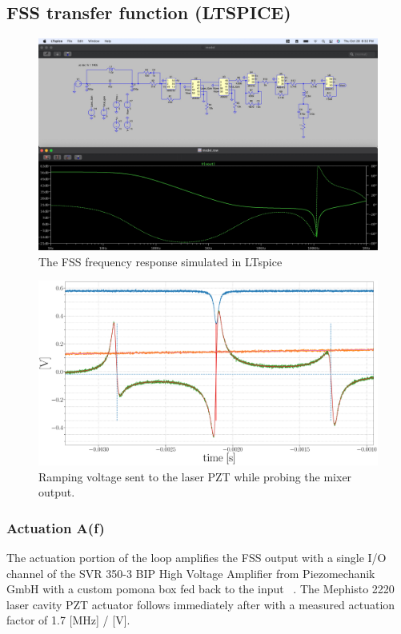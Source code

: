 \begin{landscape}
    \section{FSS transfer function (LTSPICE)}\label{fig:fss_tf}
\begin{figure}[H]
  \begin{center}
    \includegraphics[width=1.33\textwidth]{figs/ALGAAS/tfs/spice_FSS_tf.pdf}
    \caption{The FSS frequency response simulated in LTspice}
  \end{center}
  \label{fig:spiceFSS}
\end{figure}
\end{landscape}

\begin{figure}[H]    
    \centering
	\includegraphics[width=.87\textwidth]{figs/ALGAAS/pdh_measured.pdf}
	\caption{Ramping voltage sent to the laser PZT while probing the mixer output.}
\label{fig:pdhmeasured}
\end{figure}

\subsubsection{Actuation A(f)}
The actuation portion of the loop amplifies the FSS output with a single I/O channel of the SVR 350-3 BIP High Voltage Amplifier from Piezomechanik GmbH with a custom pomona box fed back to the input ~\cite{sugwglog:412}. The Mephisto 2220 laser cavity PZT actuator follows immediately after with a measured actuation factor of 1.7 [MHz] / [V].

